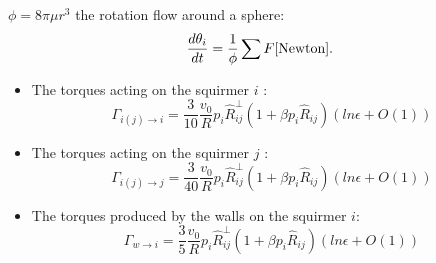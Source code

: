 \documentclass{beamer}
\begin{document}
\begin{frame}
    $\phi = 8\pi\mu r^3$ the rotation flow around a sphere\cite{Stokes}:
$$\frac{d \theta_i}{dt} = \frac{1}{\phi}\sum F\cite{Newton}.$$
    \begin{itemize}
        \item The torques acting on the squirmer $i$ :
        \begin{equation*}
        \boxed{\Gamma_{i(j)\rightarrow i} = \frac{3}{10}\frac{v_0}{R}p_i\hat{R}_{ij}^{\perp}(1 + \beta p_i\hat{R}_{ij})(ln \epsilon + O(1))}
    \end{equation*}
        \item The torques acting on the squirmer $j$ :
        \begin{equation*}
        \boxed{\Gamma_{i(j)\rightarrow j} = \frac{3}{40}\frac{v_0}{R}p_i\hat{R}_{ij}^{\perp}(1 + \beta p_i\hat{R}_{ij})(ln \epsilon + O(1))}
    \end{equation*}
        \item The torques produced by the walls on the squirmer $i$:
        \begin{equation*}
            \boxed{\Gamma_{w\rightarrow i} = \frac{3}{5} \frac{v_0}{R}p_i\hat{R}_{ij}^{\perp}(1 + \beta p_i\hat{R}_{ij})(ln \epsilon + O(1))}
        \end{equation*}
    \end{itemize}
        
\end{frame}
\end{document}
